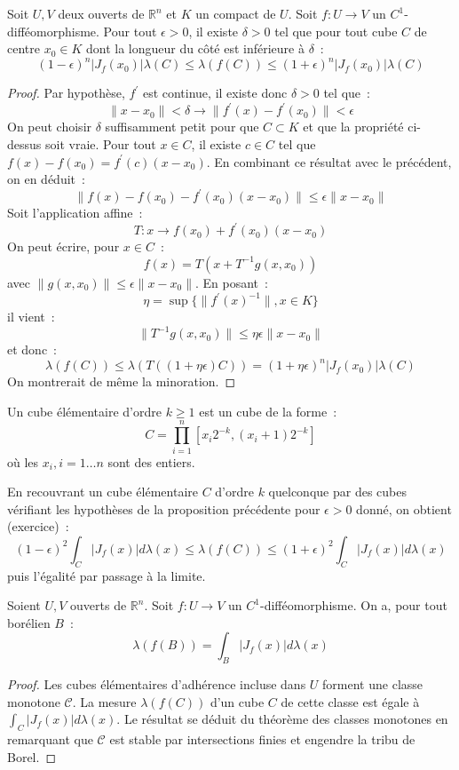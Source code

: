 \begin{prop}
Soit $U,V$ deux ouverts de $\mathbb{R}^n$ et $K$ un compact de $U$. Soit $f : U \to V$ un
$C^1$-difféomorphisme. Pour tout $\epsilon > 0$, il existe $\delta >
0$ tel que pour tout cube $C$ de centre $x_0 \in K$ dont la longueur du
côté est inférieure à $\delta$~:
\[
(1-\epsilon)^n |J_f(x_0)| \lambda(C) \leq \lambda(f(C)) \leq (1+\epsilon)^n
|J_f(x_0)| \lambda(C)
\]
\end{prop}
\begin{proof}
Par hypothèse, $f^\prime$ est continue, il existe donc $\delta > 0$
tel que~:
\[
\| x - x_0 \| < \delta \rightarrow \| f^\prime(x) - f^\prime(x_0) \| < \epsilon
\]
On peut choisir $\delta$ suffisamment petit pour que  $C \subset K$
et que la propriété ci-dessus soit vraie. 
Pour tout $x \in C$, il existe $c \in C$ tel que $f(x) - f(x_0) =
f^\prime(c) (x-x_0)$. En combinant ce résultat avec le précédent, on
en déduit~:
\[
\| f(x) - f(x_0) - f^\prime(x_0)(x-x_0)\| \leq \epsilon \|x-x_0\|
\]
Soit l'application affine~:
\[
T : x \to f(x_0)+f^\prime(x_0)(x-x_0)
\]
On peut écrire, pour $x \in C$~:
\[
f(x) = T(x + T^{-1}g(x,x_0))
\]
avec $\| g(x,x_0) \| \leq \epsilon \|x -x_0\|$.
En posant~:
\[
\eta = \sup \{ \| f^{\prime}(x)^{-1} \|, x \in K \}
\]
il vient~:
\[
\|  T^{-1}g(x,x_0) \| \leq \eta \epsilon \| x - x_0 \|
\]
et donc~:
\[
\lambda(f(C)) \leq \lambda(T((1+\eta \epsilon )C)) =
(1+\eta\epsilon)^n |J_f(x_0)| \lambda(C)
\]
On montrerait de même la minoration.
\end{proof}
\begin{defn}
Un cube élémentaire d'ordre $k \geq 1$ est un cube de la forme~:
\[
C = \prod_{i=1}^n [ x_i 2^{-k}, (x_i + 1)2^{-k} ]
\]
où les $x_i, i=1\dots n$ sont des entiers.
\end{defn}
En recouvrant un cube élémentaire $C$ d'ordre $k$ quelconque par des
cubes vérifiant les hypothèses de la proposition précédente pour
$\epsilon > 0$ donné, on obtient (exercice)~:
\[
(1-\epsilon)^2 \int_{C} |J_f(x)|d \lambda(x) \leq \lambda(f(C)) \leq
(1+\epsilon)^2 \int_{C} |J_f(x)| d \lambda(x)
\]
puis l'égalité par passage à la limite. 
\begin{mandatory}
\begin{prop}
Soient $U,V$ ouverts de $\mathbb{R}^n$. Soit $f : U \to V$ un
$C^1$-difféomorphisme. On a, pour tout borélien $B$~:
\[
\lambda(f(B)) = \int_B |J_f(x) |d \lambda(x)
\]
\end{prop}
\end{mandatory}
\begin{proof}
Les cubes élémentaires d'adhérence incluse dans $U$ forment une
classe monotone $\mathcal{C}$. La mesure  $\lambda(f(C))$ d'un cube
$C$ de cette classe est égale à $ \int_C |J_f(x) |d \lambda(x)$. Le
résultat se déduit du théorème des classes monotones en remarquant que
$\mathcal{C}$ est stable par intersections finies et engendre la tribu
de Borel.
\end{proof}
